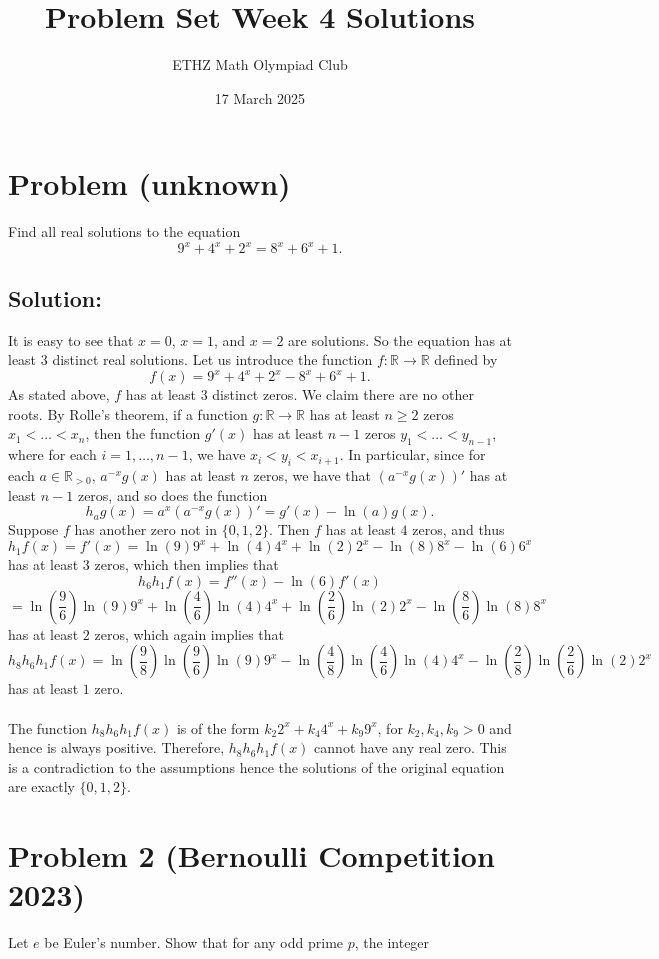 \documentclass[11pt, a4paper, oneside]{article}
\title{Problem Set Week 4 Solutions}
\author{ETHZ Math Olympiad Club}
\date{17 March 2025}
\newcommand{\problem}[1][]{\section{#1} \hfill \par}
\newcommand{\solution}[1][]{\subsection*{#1}\hfill \par}
\theoremstyle{remark}
\theoremstyle{lemma}
\begin{document}
\maketitle
\problem[Problem (unknown)]
Find all real solutions to the equation
\[
9^{x} + 4^{x}+2^{x} = 8^{x} + 6^{x}+1.
\]
\solution[Solution:] 
It is easy to see that \( x = 0 \), \( x = 1 \), and \( x = 2 \) are solutions. So the equation has at least 3 distinct real solutions. Let us introduce the function \( f: \mathbb{R} \rightarrow \mathbb{R} \) defined by
\[
f(x) = 9^{x} + 4^{x} + 2^{x} - 8^{x} + 6^{x} + 1.
\]
As stated above, \( f \) has at least 3 distinct zeros. We claim there are no other roots. By Rolle's theorem, if a function \( g: \mathbb{R} \rightarrow \mathbb{R} \) has at least \( n \geq 2 \) zeros \( x_1 < \dots < x_n \), then the function \( g'(x) \) has at least \( n - 1 \) zeros \( y_1 < \dots < y_{n-1} \), where for each \( i = 1, \dots, n-1 \), we have \( x_i < y_i < x_{i+1} \). In particular, since for each \( a \in \mathbb{R}_{>0} \), \( a^{-x} g(x) \) has at least \( n \) zeros, we have that \( \left( a^{-x} g(x) \right)' \) has at least \( n - 1 \) zeros, and so does the function
\[
h_{a} g(x) = a^x \left( a^{-x} g(x) \right)' = g'(x) - \ln(a) g(x).
\]
Suppose \( f \) has another zero not in \( \{0, 1, 2\} \). Then \( f \) has at least \( 4 \) zeros, and thus
\[
h_{1} f(x) = f'(x) = \ln(9) 9^x + \ln(4) 4^x + \ln(2) 2^x - \ln(8) 8^x - \ln(6) 6^x
\]
has at least \( 3 \) zeros, which then implies that
\[
h_{6} h_{1} f(x) = f''(x) - \ln(6) f'(x)
\]
\[
= \ln\left( \frac{9}{6} \right) \ln(9) 9^x + \ln\left( \frac{4}{6} \right) \ln(4) 4^x + \ln\left( \frac{2}{6} \right) \ln(2) 2^x - \ln\left( \frac{8}{6} \right) \ln(8) 8^x
\]
has at least \( 2 \) zeros, which again implies that
\[
h_{8} h_{6} h_{1} f(x) = \ln\left( \frac{9}{8} \right) \ln\left( \frac{9}{6} \right) \ln(9) 9^x - \ln\left( \frac{4}{8} \right) \ln\left( \frac{4}{6} \right) \ln(4) 4^x - \ln\left( \frac{2}{8} \right) \ln\left( \frac{2}{6} \right) \ln(2) 2^x
\]
has at least \( 1 \) zero.
\\\\
The function \( h_{8} h_{6} h_{1} f(x) \) is of the form \( k_{2} 2^x + k_{4} 4^x + k_{9} 9^x \), for $k_2, k_4, k_9>0$ and hence is always positive. Therefore, \( h_{8} h_{6} h_{1} f(x) \) cannot have any real zero. This is a contradiction to the assumptions hence the solutions of the original equation are exactly \( \{0, 1, 2\} \).
\newpage
\problem[Problem 2 (Bernoulli Competition 2023)]
Let \( e \) be Euler’s number. Show that for any odd prime \( p \), the integer
\end{document}
